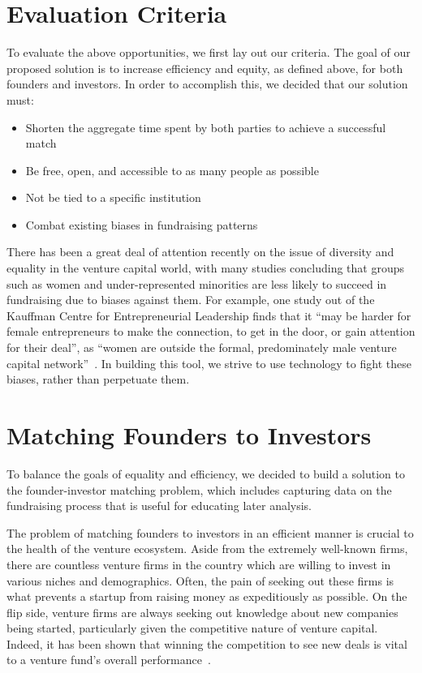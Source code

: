 \section{Evaluation Criteria}

To evaluate the above opportunities, we first lay out our criteria. The goal of our proposed solution is to increase efficiency and equity, as defined above, for both founders and investors. In order to accomplish this, we decided that our solution must:

\begin{itemize}
  \item Shorten the aggregate time spent by both parties to achieve a successful match
  \item Be free, open, and accessible to as many people as possible
  \item Not be tied to a specific institution
  \item Combat existing biases in fundraising patterns
\end{itemize}

There has been a great deal of attention recently on the issue of diversity and equality in the venture capital world, with many studies concluding that groups such as women and under-represented minorities are less likely to succeed in fundraising due to biases against them. For example, one study out of the Kauffman Centre for Entrepreneurial Leadership finds that it ``may be harder for female entrepreneurs to make the connection, to get in the door, or gain attention for their deal'', as ``women are outside the formal, predominately male venture capital network''~\cite{doi:10.1080/13691060118175}. In building this tool, we strive to use technology to fight these biases, rather than perpetuate them.

\section{Matching Founders to Investors}

To balance the goals of equality and efficiency, we decided to build a solution to the founder-investor matching problem, which includes capturing data on the fundraising process that is useful for educating later analysis.

The problem of matching founders to investors in an efficient manner is crucial to the health of the venture ecosystem. Aside from the extremely well-known firms, there are countless venture firms in the country which are willing to invest in various niches and demographics. Often, the pain of seeking out these firms is what prevents a startup from raising money as expeditiously as possible. On the flip side, venture firms are always seeking out knowledge about new companies being started, particularly given the competitive nature of venture capital. Indeed, it has been shown that winning the competition to see new deals is vital to a venture fund's overall performance~\cite{doi:10.1111/j.1540-6261.2007.01207.x}.

